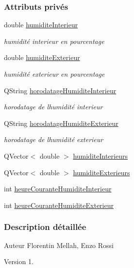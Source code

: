 \subsubsection*{Attributs privés}
\begin{DoxyCompactItemize}
\item 
double \hyperlink{class_infos_humidite_ad2847e671ad0b90f8dc0940dee107c38}{humidite\+Interieur}
\begin{DoxyCompactList}\small\item\em humidité interieur en pourcentage \end{DoxyCompactList}\item 
double \hyperlink{class_infos_humidite_a503a9c849508928d3046292f17f37230}{humidite\+Exterieur}
\begin{DoxyCompactList}\small\item\em humidité exterieur en pourcentage \end{DoxyCompactList}\item 
Q\+String \hyperlink{class_infos_humidite_a38712bac5a2d4d106a016647ad39fedf}{horodatage\+Humidite\+Interieur}
\begin{DoxyCompactList}\small\item\em horodatage de l\textquotesingle{}humidité interieur \end{DoxyCompactList}\item 
Q\+String \hyperlink{class_infos_humidite_aa08b4f342e83f8ad437a8272698bb512}{horodatage\+Humidite\+Exterieur}
\begin{DoxyCompactList}\small\item\em horodatage de l\textquotesingle{}humidité exterieur \end{DoxyCompactList}\item 
Q\+Vector$<$ double $>$ \hyperlink{class_infos_humidite_a2bcd5b3629a007078d4e15d110dae457}{humidite\+Interieurs}
\item 
Q\+Vector$<$ double $>$ \hyperlink{class_infos_humidite_a62d1331116ee1cf00cb8fa369a214c62}{humidite\+Exterieurs}
\item 
int \hyperlink{class_infos_humidite_a5a8597751ba0fe10a14a12e155421485}{heure\+Courante\+Humidite\+Interieur}
\item 
int \hyperlink{class_infos_humidite_ad7b450373a47ec831872872e0e5674ad}{heure\+Courante\+Humidite\+Exterieur}
\end{DoxyCompactItemize}


\subsubsection{Description détaillée}
\begin{DoxyAuthor}{Auteur}
Florentin Mellah, Enzo Rossi
\end{DoxyAuthor}
\begin{DoxyVersion}{Version}
1. 
\end{DoxyVersion}


